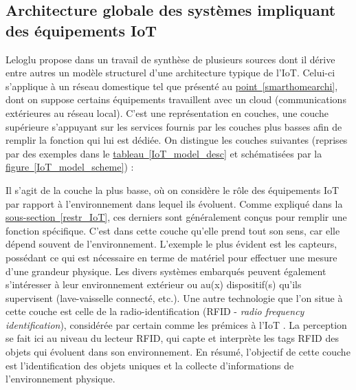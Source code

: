 \documentclass[]{article}
\newcommand{\minit}[1]{\noindent{\small\textbf{ \underline{#1}}}\vspace{0.2cm}}
\newcommand{\wordlink}[2]{\hyperref[#1]{#2~\ref{#1}}}
\begin{document}
\newpage

\subsection{Architecture globale des systèmes impliquant des équipements IoT}

Leloglu propose dans \cite{Leloglu2017} un travail de synthèse de plusieurs sources dont il dérive entre autres un modèle structurel d'une architecture typique de l'IoT. Celui-ci s'applique à un réseau domestique tel que présenté au \wordlink{smarthomearchi}{point}, dont on suppose certains équipements travaillent avec un cloud (communications extérieures au réseau local). C'est une représentation en couches, une couche supérieure s'appuyant sur les services fournis par les couches plus basses afin de remplir la fonction qui lui est dédiée. On distingue les couches suivantes (reprises par des exemples dans le \wordlink{IoT_model_desc}{tableau} et schématisées par la \wordlink{IoT_model_scheme}{figure}) :\\

\minit{La couche perception}

Il s'agit de la couche la plus basse, où on considère le rôle des équipements IoT par rapport à l'environnement dans lequel ils évoluent. Comme expliqué dans la \wordlink{restr_IoT}{sous-section}, ces derniers sont généralement conçus pour remplir une fonction spécifique. C'est dans cette couche qu'elle prend tout son sens, car elle dépend souvent de l'environnement. L'exemple le plus évident est les capteurs, possédant ce qui est nécessaire en terme de matériel pour effectuer une mesure d'une grandeur physique. Les divers systèmes embarqués peuvent également s'intéresser à leur environnement extérieur ou au(x) dispositif(s) qu'ils supervisent (lave-vaisselle connecté, etc.). Une autre technologie que l'on situe à cette couche est celle de la radio-identification (RFID - \textit{radio frequency identification}), considérée par certain comme les prémices à l'IoT \cite{Berte2018}. La perception se fait ici au niveau du lecteur RFID, qui capte et interprète les tags RFID des objets qui évoluent dans son environnement. En résumé, l'objectif de cette couche est l'identification des objets uniques et la collecte d'informations de l'environnement physique.\\ 

\minit{La couche réseau}
\end{document}
